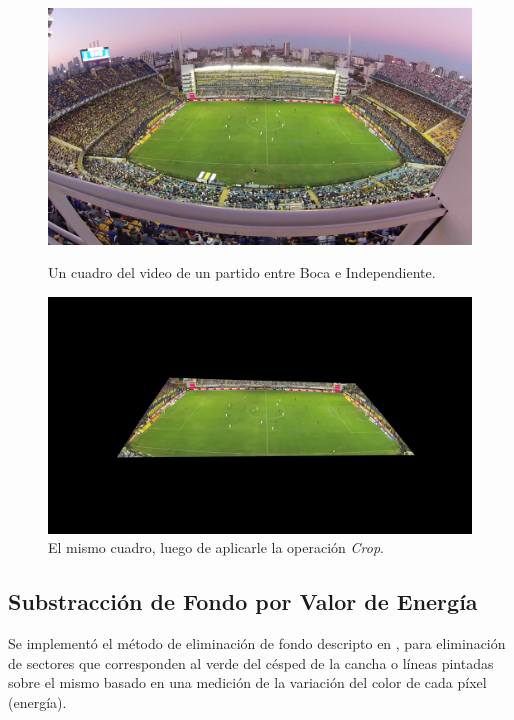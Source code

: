 \begin{figure}[H]
  \centering
    \begin{minipage}[t]{.45\textwidth}
      \includegraphics[width=\linewidth]{./images/Crop_Antes.png}
      \caption{Un cuadro del video de un partido entre Boca e Independiente.
      \label{fig:crop-antes}}
    \end{minipage}
    \begin{minipage}[t]{.45\textwidth}
      \centering
      \includegraphics[width=\linewidth]{./images/Crop_Despues.png}
      \caption{El mismo cuadro, luego de aplicarle la operación \textit{Crop}.
      \label{fig:crop-despues}}
    \end{minipage}
\end{figure}

\subsection{Substracción de Fondo por Valor de Energía}

Se implementó el método de eliminación de fondo descripto en
\cite{papers-tanos}, para eliminación de sectores que corresponden al
verde del césped de la cancha o líneas pintadas sobre el mismo basado en una
medición de la variación del color de cada píxel (energía).


